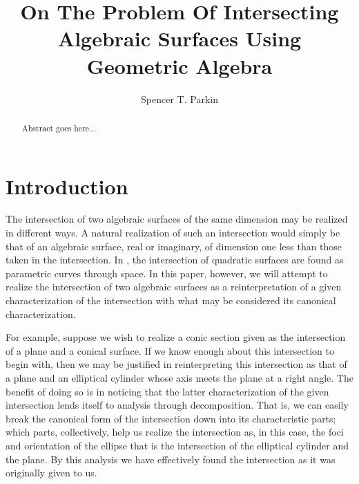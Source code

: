 \documentclass{birkjour}
\theoremstyle{definition}
\theoremstyle{remark}
\numberwithin{equation}{section}
\begin{document}
\title{On The Problem Of Intersecting\\Algebraic Surfaces Using\\Geometric Algebra}

\author{Spencer T. Parkin}
\address{102 W. 500 S., \\
Salt Lake City, UT  84101} 



\begin{abstract}
Abstract goes here...
\end{abstract}


\maketitle

\section{Introduction}

The intersection of two algebraic surfaces of the same dimension may be
realized in different ways.  A natural realization of such an intersection would
simply be that of an algebraic surface, real or imaginary, of dimension one
less than those taken in the intersection.  In \cite{}, the intersection of quadratic surfaces
are found as parametric curves through space.
In this paper, however, we will attempt to realize the intersection of two algebraic surfaces as a
reinterpretation of a given characterization of the intersection with what may be considered
its canonical characterization.

For example, suppose we wish to realize a conic section given as the intersection of a plane
and a conical surface.  If we know enough about this intersection to begin with, then we may
be justified in reinterpreting this intersection as that of a plane and an elliptical cylinder whose
axis meets the plane at a right angle.  The benefit of doing so is in noticing that the latter
characterization of the given intersection lends itself to analysis through decomposition.
That is, we can easily break the canonical form of the intersection down into its characteristic
parts; which parts, collectively, help us realize the intersection as, in this case, the foci and orientation of
the ellipse that is the intersection of the elliptical cylinder and the plane.  By this analysis
we have effectively found the intersection as it was originally given to us.
\end{document}
